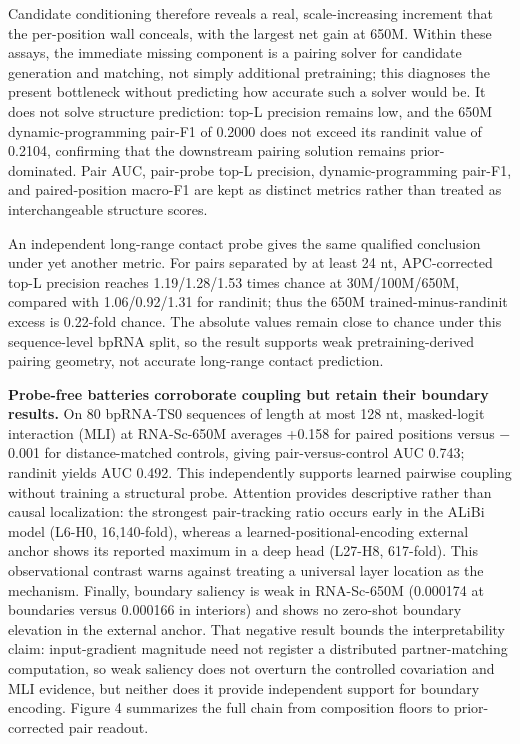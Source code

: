 Candidate conditioning therefore reveals a real, scale-increasing increment that the per-position wall conceals, with the largest net gain at 650M. Within these assays, the immediate missing component is a pairing solver for candidate generation and matching, not simply additional pretraining; this diagnoses the present bottleneck without predicting how accurate such a solver would be. It does not solve structure prediction: top-L precision remains low, and the 650M dynamic-programming pair-F1 of 0.2000 does not exceed its randinit value of 0.2104, confirming that the downstream pairing solution remains prior-dominated. Pair AUC, pair-probe top-L precision, dynamic-programming pair-F1, and paired-position macro-F1 are kept as distinct metrics rather than treated as interchangeable structure scores.

An independent long-range contact probe gives the same qualified conclusion under yet another metric. For pairs separated by at least 24 nt, APC-corrected top-L precision reaches 1.19/1.28/1.53 times chance at 30M/100M/650M, compared with 1.06/0.92/1.31 for randinit; thus the 650M trained-minus-randinit excess is 0.22-fold chance. The absolute values remain close to chance under this sequence-level bpRNA split, so the result supports weak pretraining-derived pairing geometry, not accurate long-range contact prediction.

\textbf{Probe-free batteries corroborate coupling but retain their boundary results.} On 80 bpRNA-TS0 sequences of length at most 128 nt, masked-logit interaction (MLI) at RNA-Sc-650M averages +0.158 for paired positions versus \(-\)0.001 for distance-matched controls, giving pair-versus-control AUC 0.743; randinit yields AUC 0.492. This independently supports learned pairwise coupling without training a structural probe. Attention provides descriptive rather than causal localization: the strongest pair-tracking ratio occurs early in the ALiBi model (L6-H0, 16,140-fold), whereas a learned-positional-encoding external anchor shows its reported maximum in a deep head (L27-H8, 617-fold). This observational contrast warns against treating a universal layer location as the mechanism. Finally, boundary saliency is weak in RNA-Sc-650M (0.000174 at boundaries versus 0.000166 in interiors) and shows no zero-shot boundary elevation in the external anchor. That negative result bounds the interpretability claim: input-gradient magnitude need not register a distributed partner-matching computation, so weak saliency does not overturn the controlled covariation and MLI evidence, but neither does it provide independent support for boundary encoding. Figure 4 summarizes the full chain from composition floors to prior-corrected pair readout.

